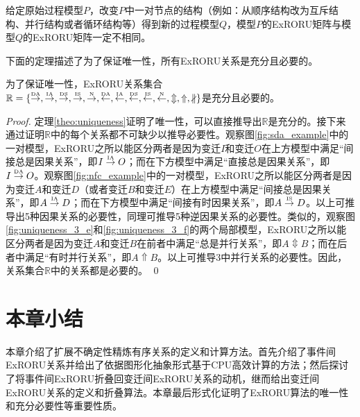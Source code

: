 \begin{corollary}\label{cor:change_structure}
给定原始过程模型$P$，改变$P$中一对节点的结构（例如：从顺序结构改为互斥结构、并行结构或者循环结构等）得到新的过程模型$Q$，模型$P$的ExRORU矩阵与模型$Q$的ExRORU矩阵一定不相同。
\end{corollary}

下面的定理描述了为了保证唯一性，所有ExRORU关系是充分且必要的。

\begin{theorem}[充分性和必要性]\label{theo:necessity_sufficiency}
为了保证唯一性，ExRORU关系集合$\mathbb{R}=\{\overset{\text{\tiny{DA}}}{\rightarrow},\overset{\text{\tiny{IA}}}{\rightarrow},\overset{\text{\tiny{DS}}}{\rightarrow},\overset{\text{\tiny{IS}}}{\rightarrow},\overset{\text{\tiny{N}}}{\rightarrow},\overset{\text{\tiny{DA}}}{\leftarrow},\overset{\text{\tiny{IA}}}{\leftarrow},\overset{\text{\tiny{DS}}}{\leftarrow},\overset{\text{\tiny{IS}}}{\leftarrow},\overset{\text{\tiny{N}}}{\leftarrow},\Updownarrow,\Uparrow,\nparallel\}$是充分且必要的。
\end{theorem}

\begin{proof}
定理\ref{theo:uniqueness}证明了唯一性，可以直接推导出$\mathbb{R}$是充分的。接下来通过证明$\mathbb{R}$中的每个关系都不可缺少以推导必要性。观察图\ref{fig:sda_example}中的一对模型，ExRORU之所以能区分两者是因为变迁$I$和变迁$O$在上方模型中满足“间接总是因果关系”，即$I\overset{\text{\tiny{IA}}}{\rightarrow}O$；而在下方模型中满足“直接总是因果关系”，即$I\overset{\text{\tiny{DA}}}{\rightarrow}O$。观察图\ref{fig:nfc_example}中的一对模型，ExRORU之所以能区分两者是因为变迁$A$和变迁$D$（或者变迁$B$和变迁$E$）在上方模型中满足“间接总是因果关系”，即$A\overset{\text{\tiny{IA}}}{\rightarrow}D$；而在下方模型中满足“间接有时因果关系”，即$A\overset{\text{\tiny{IS}}}{\rightarrow}D$。以上可推导出5种因果关系的必要性，同理可推导5种逆因果关系的必要性。类似的，观察图\ref{fig:uniqueness_3_e}和\ref{fig:uniqueness_3_f}的两个局部模型，ExRORU之所以能区分两者是因为变迁$A$和变迁$B$在前者中满足“总是并行关系”，即$A\Updownarrow B$；而在后者中满足“有时并行关系”，即$A\Uparrow B$。以上可推导3中并行关系的必要性。因此，关系集合$\mathbb{R}$中的关系都是必要的。
\qed
\end{proof}

\section{本章小结}
本章介绍了扩展不确定性精炼有序关系的定义和计算方法。首先介绍了事件间ExRORU关系并给出了依据图形化抽象形式基于CPU高效计算的方法；然后探讨了将事件间ExRORU折叠回变迁间ExRORU关系的动机，继而给出变迁间ExRORU关系的定义和折叠算法。本章最后形式化证明了ExRORU算法的唯一性和充分必要性等重要性质。